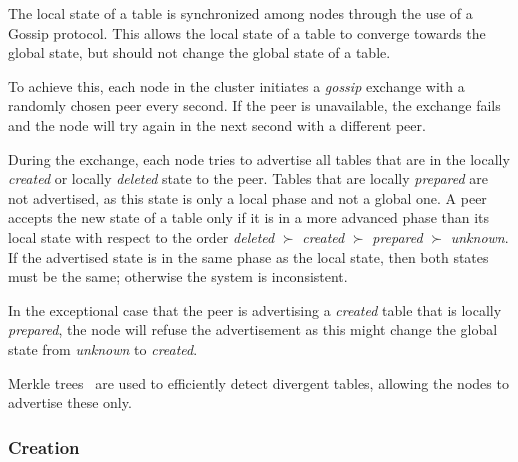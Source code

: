 The local state of a table is synchronized among nodes through the use of a
Gossip protocol.
This allows the local state of a table to converge towards the global state,
but should not change the global state of a table.

To achieve this, each node in the cluster initiates a \emph{gossip} exchange
with a randomly chosen peer every second.
If the peer is unavailable, the exchange fails and the node will try again in
the next second with a different peer.

During the exchange, each node tries to advertise all tables that are in the
locally \emph{created} or locally \emph{deleted} state to the peer.
Tables that are locally \emph{prepared} are not advertised, as this state is
only a local phase and not a global one.
A peer accepts the new state of a table only if it is in a more advanced phase
than its local state with respect to the order \emph{deleted} $\succ$
\emph{created} $\succ$ \emph{prepared} $\succ$ \emph{unknown}.
If the advertised state is in the same phase as the local state, then both
states must be the same; otherwise the system is inconsistent.

In the exceptional case that the peer is advertising a \emph{created} table
that is locally \emph{prepared}, the node will refuse the advertisement as this
might change the global state from \emph{unknown} to \emph{created}.

Merkle trees~\cite{MerkleTree} are used to efficiently detect divergent tables,
allowing the nodes to advertise these only.

\subsubsection{Creation}
\label{subsubsec:creation}

